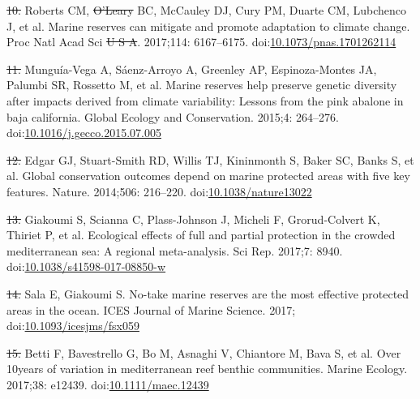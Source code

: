 \documentclass[12pt,]{article}
\providecommand{\DIFaddtex}[1]{{\protect\color{blue}\uwave{#1}}} %
\providecommand{\DIFdeltex}[1]{{\protect\color{red}\sout{#1}}}                      %
\providecommand{\DIFaddbegin}{} %
\providecommand{\DIFaddend}{} %
\providecommand{\DIFdelbegin}{} %
\providecommand{\DIFdelend}{} %
\providecommand{\DIFadd}[1]{\texorpdfstring{\DIFaddtex{#1}}{#1}} %
\providecommand{\DIFdel}[1]{\texorpdfstring{\DIFdeltex{#1}}{}} %
\newcommand{\DIFscaledelfig}{0.5}
\newlength{\DIFdelgraphicswidth} %
\newlength{\DIFdelgraphicsheight} %
\newcommand{\DIFaddincludegraphics}[2][]{{\color{blue}\fbox{\DIFOincludegraphics[#1]{#2}}}} %
\newcommand{\DIFdelincludegraphics}[2][]{%
\sbox{\DIFdelgraphicsbox}{\DIFOincludegraphics[#1]{#2}}%
\settoboxwidth{\DIFdelgraphicswidth}{\DIFdelgraphicsbox} %
\settoboxtotalheight{\DIFdelgraphicsheight}{\DIFdelgraphicsbox} %
\scalebox{\DIFscaledelfig}{%
\parbox[b]{\DIFdelgraphicswidth}{\usebox{\DIFdelgraphicsbox}\\[-\baselineskip] \rule{\DIFdelgraphicswidth}{0em}}\llap{\resizebox{\DIFdelgraphicswidth}{\DIFdelgraphicsheight}{%
\setlength{\unitlength}{\DIFdelgraphicswidth}%
\begin{picture}(1,1)%
\thicklines\linethickness{2pt} %
{\color[rgb]{1,0,0}\put(0,0){\framebox(1,1){}}}%
{\color[rgb]{1,0,0}\put(0,0){\line( 1,1){1}}}%
{\color[rgb]{1,0,0}\put(0,1){\line(1,-1){1}}}%
\end{picture}%
}\hspace*{3pt}}} %
} %
\DeclareRobustCommand{\DIFaddbegin}{\DIFOaddbegin \let\includegraphics\DIFaddincludegraphics} %
\DeclareRobustCommand{\DIFaddend}{\DIFOaddend \let\includegraphics\DIFOincludegraphics} %
\DeclareRobustCommand{\DIFdelbegin}{\DIFOdelbegin \let\includegraphics\DIFdelincludegraphics} %
\DeclareRobustCommand{\DIFdelend}{\DIFOaddend \let\includegraphics\DIFOincludegraphics} %
\begin{document}
\hypertarget{ref-roberts_2017-J9}{}
\DIFdelbegin \DIFdel{10. }\DIFdelend \DIFaddbegin \DIFadd{9. }\DIFaddend Roberts CM, \DIFdelbegin \DIFdel{O'Leary }\DIFdelend \DIFaddbegin \DIFadd{OLeary }\DIFaddend BC, McCauley DJ, Cury PM, Duarte CM, Lubchenco J,
et al. Marine reserves can mitigate and promote adaptation to climate
change. Proc Natl Acad Sci \DIFdelbegin \DIFdel{U S A}\DIFdelend \DIFaddbegin \DIFadd{USA}\DIFaddend . 2017;114: 6167--6175.
doi:\href{https://doi.org/10.1073/pnas.1701262114}{10.1073/pnas.1701262114}

\hypertarget{ref-munguavega_2015-yg}{}
\DIFdelbegin \DIFdel{11. }\DIFdelend \DIFaddbegin \DIFadd{10. }\DIFaddend Munguía-Vega A, Sáenz-Arroyo A, Greenley AP, Espinoza-Montes JA,
Palumbi SR, Rossetto M, et al. Marine reserves help preserve genetic
diversity after impacts derived from climate variability: Lessons from
the pink abalone in baja california. Global Ecology and Conservation.
2015;4: 264--276.
doi:\href{https://doi.org/10.1016/j.gecco.2015.07.005}{10.1016/j.gecco.2015.07.005}

\hypertarget{ref-edgar_2014-UO}{}
\DIFdelbegin \DIFdel{12. }\DIFdelend \DIFaddbegin \DIFadd{11. }\DIFaddend Edgar GJ, Stuart-Smith RD, Willis TJ, Kininmonth S, Baker SC, Banks
S, et al. Global conservation outcomes depend on marine protected areas
with five key features. Nature. 2014;506: 216--220.
doi:\href{https://doi.org/10.1038/nature13022}{10.1038/nature13022}

\hypertarget{ref-giakoumi_2017-V2}{}
\DIFdelbegin \DIFdel{13. }\DIFdelend \DIFaddbegin \DIFadd{12. }\DIFaddend Giakoumi S, Scianna C, Plass-Johnson J, Micheli F, Grorud-Colvert K,
Thiriet P, et al. Ecological effects of full and partial protection in
the crowded mediterranean sea: A regional meta-analysis. Sci Rep.
2017;7: 8940.
doi:\href{https://doi.org/10.1038/s41598-017-08850-w}{10.1038/s41598-017-08850-w}

\hypertarget{ref-sala_2017-69}{}
\DIFdelbegin \DIFdel{14. }\DIFdelend \DIFaddbegin \DIFadd{13. }\DIFaddend Sala E, Giakoumi S. No-take marine reserves are the most effective
protected areas in the ocean. ICES Journal of Marine Science. 2017;
doi:\href{https://doi.org/10.1093/icesjms/fsx059}{10.1093/icesjms/fsx059}

\hypertarget{ref-betti_2017-lq}{}
\DIFdelbegin \DIFdel{15. }\DIFdelend \DIFaddbegin \DIFadd{14. }\DIFaddend Betti F, Bavestrello G, Bo M, Asnaghi V, Chiantore M, Bava S, et al.
Over 10\DIFaddbegin \DIFadd{~}\DIFaddend years of variation in mediterranean reef benthic communities.
Marine Ecology. 2017;38: e12439.
doi:\href{https://doi.org/10.1111/maec.12439}{10.1111/maec.12439}
\end{document}
